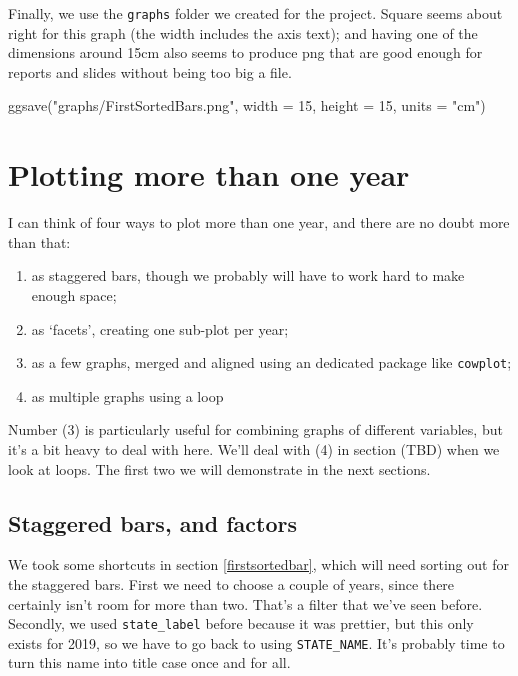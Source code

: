 \documentclass[
]{book}
\newenvironment{Shaded}{\begin{snugshade}}{\end{snugshade}}
\newcommand{\AttributeTok}[1]{\textcolor[rgb]{0.77,0.63,0.00}{#1}}
\newcommand{\DecValTok}[1]{\textcolor[rgb]{0.00,0.00,0.81}{#1}}
\newcommand{\FunctionTok}[1]{\textcolor[rgb]{0.00,0.00,0.00}{#1}}
\newcommand{\NormalTok}[1]{#1}
\newcommand{\StringTok}[1]{\textcolor[rgb]{0.31,0.60,0.02}{#1}}
\providecommand{\tightlist}{%
  \setlength{\itemsep}{0pt}\setlength{\parskip}{0pt}}
\begin{document}
Finally, we use the \texttt{graphs} folder we created for the project. Square seems about right for this graph (the width includes the axis text); and having one of the dimensions around 15cm also seems to produce png that are good enough for reports and slides without being too big a file.

\begin{Shaded}
\begin{Highlighting}[]
\FunctionTok{ggsave}\NormalTok{(}\StringTok{"graphs/FirstSortedBars.png"}\NormalTok{, }\AttributeTok{width =} \DecValTok{15}\NormalTok{, }\AttributeTok{height =} \DecValTok{15}\NormalTok{, }\AttributeTok{units =} \StringTok{"cm"}\NormalTok{)}
\end{Highlighting}
\end{Shaded}

\hypertarget{plotting-more-than-one-year}{%
\section{Plotting more than one year}\label{plotting-more-than-one-year}}

I can think of four ways to plot more than one year, and there are no doubt more than that:

\begin{enumerate}
\def\labelenumi{\arabic{enumi})}
\tightlist
\item
  as staggered bars, though we probably will have to work hard to make enough space;
\item
  as `facets', creating one sub-plot per year;
\item
  as a few graphs, merged and aligned using an dedicated package like \texttt{cowplot};
\item
  as multiple graphs using a loop
\end{enumerate}

Number (3) is particularly useful for combining graphs of different variables, but it's a bit heavy to deal with here. We'll deal with (4) in section (TBD) when we look at loops. The first two we will demonstrate in the next sections.

\hypertarget{factors}{%
\subsection{Staggered bars, and factors}\label{factors}}

We took some shortcuts in section \ref{firstsortedbar}, which will need sorting out for the staggered bars. First we need to choose a couple of years, since there certainly isn't room for more than two. That's a filter that we've seen before. Secondly, we used \texttt{state\_label} before because it was prettier, but this only exists for 2019, so we have to go back to using \texttt{STATE\_NAME}. It's probably time to turn this name into title case once and for all.
\end{document}
